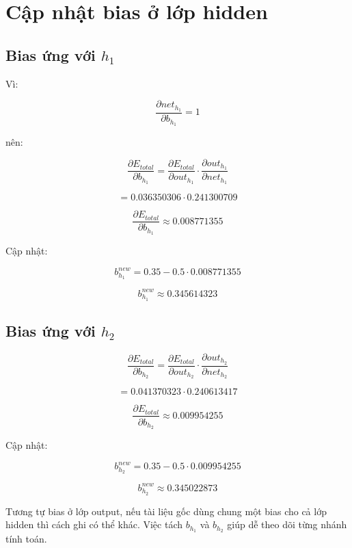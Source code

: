 \documentclass[12pt,a4paper]{report}
\begin{document}
\chapter{Cập nhật bias ở lớp hidden}

\section{Bias ứng với $h_1$}

Vì:

\[
    \frac{\partial net_{h_1}}{\partial b_{h_1}}=1
\]

nên:

\[
    \frac{\partial E_{total}}{\partial b_{h_1}}
    =
    \frac{\partial E_{total}}{\partial out_{h_1}}
    \cdot
    \frac{\partial out_{h_1}}{\partial net_{h_1}}
\]

\[
    =
    0.036350306
    \cdot
    0.241300709
\]

\[
    \frac{\partial E_{total}}{\partial b_{h_1}}
    \approx 0.008771355
\]

Cập nhật:

\[
    b_{h_1}^{new}
    =
    0.35
    -
    0.5\cdot 0.008771355
\]

\[
    b_{h_1}^{new}
    \approx 0.345614323
\]

\section{Bias ứng với $h_2$}

\[
    \frac{\partial E_{total}}{\partial b_{h_2}}
    =
    \frac{\partial E_{total}}{\partial out_{h_2}}
    \cdot
    \frac{\partial out_{h_2}}{\partial net_{h_2}}
\]

\[
    =
    0.041370323
    \cdot
    0.240613417
\]

\[
    \frac{\partial E_{total}}{\partial b_{h_2}}
    \approx 0.009954255
\]

Cập nhật:

\[
    b_{h_2}^{new}
    =
    0.35
    -
    0.5\cdot 0.009954255
\]

\[
    b_{h_2}^{new}
    \approx 0.345022873
\]

\begin{luuy}
Tương tự bias ở lớp output, nếu tài liệu gốc dùng chung một bias cho cả lớp hidden thì cách ghi có thể khác. Việc tách $b_{h_1}$ và $b_{h_2}$ giúp dễ theo dõi từng nhánh tính toán.
\end{luuy}
\end{document}
